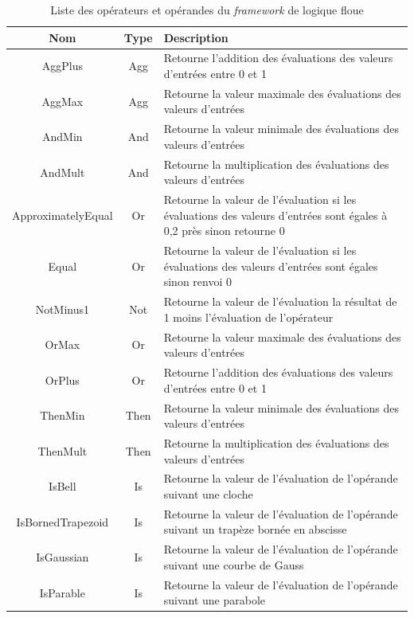 \documentclass[a4paper,11pt]{article}
\begin{document}
    \begin{table}[H]
        \caption{Liste des opérateurs et opérandes du \textit{framework} de logique floue}
        \label{tab:listing}

        \begin{center}
            \begin{tabular}{|c|c|M{9cm}|}
                \hline
                \textbf{Nom} & \textbf{Type} & \textbf{Description} \tabularnewline
                \hline
                AggPlus & Agg & Retourne l'addition des évaluations des valeurs d'entrées entre 0 et 1\tabularnewline
                \hline
                AggMax & Agg & Retourne la valeur maximale des évaluations des valeurs d'entrées\tabularnewline
                \hline
                AndMin & And & Retourne la valeur minimale des évaluations des valeurs d'entrées\tabularnewline
                \hline
                AndMult & And & Retourne la multiplication des évaluations des valeurs d'entrées\tabularnewline
                \hline
                ApproximatelyEqual & Or & Retourne la valeur de l'évaluation si les évaluations des valeurs d'entrées sont égales à 0,2 près sinon retourne 0\tabularnewline
                \hline
                Equal & Or & Retourne la valeur de l'évaluation si les évaluations des valeurs d'entrées sont égales sinon renvoi 0\tabularnewline
                \hline
                NotMinus1 & Not & Retourne la valeur de l'évaluation la résultat de 1 moins l'évaluation de l'opérateur\tabularnewline
                \hline
                OrMax & Or & Retourne la valeur maximale des évaluations des valeurs d'entrées\tabularnewline
                \hline
                OrPlus & Or & Retourne l'addition des évaluations des valeurs d'entrées entre 0 et 1\tabularnewline
                \hline
                ThenMin & Then & Retourne la valeur minimale des évaluations des valeurs d'entrées\tabularnewline
                \hline
                ThenMult & Then & Retourne la multiplication des évaluations des valeurs d'entrées\tabularnewline
                \hline
                IsBell & Is & Retourne la valeur de l'évaluation de l'opérande suivant une cloche \tabularnewline
                \hline
                IsBornedTrapezoid & Is & Retourne la valeur de l'évaluation de l'opérande suivant un trapèze bornée en abscisse \tabularnewline
                \hline
                IsGaussian & Is & Retourne la valeur de l'évaluation de l'opérande suivant une courbe de Gauss \tabularnewline
                \hline
                IsParable & Is & Retourne la valeur de l'évaluation de l'opérande suivant une parabole \tabularnewline

\end{tabular}
\end{center}
\end{table}
\end{document}
